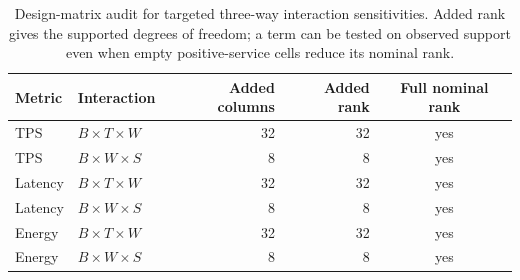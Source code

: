 \begin{table}[t]
\centering
\caption{Design-matrix audit for targeted three-way interaction sensitivities. Added rank gives the supported degrees of freedom; a term can be tested on observed support even when empty positive-service cells reduce its nominal rank.}
\label{tab:three_way_estimability}
\TableFont
\begin{tabular}{llrrc}
\hline
Metric & Interaction & Added columns & Added rank & Full nominal rank \\
\hline
TPS & $B\times T\times W$ & 32 & 32 & yes \\
TPS & $B\times W\times S$ & 8 & 8 & yes \\
Latency & $B\times T\times W$ & 32 & 32 & yes \\
Latency & $B\times W\times S$ & 8 & 8 & yes \\
Energy & $B\times T\times W$ & 32 & 32 & yes \\
Energy & $B\times W\times S$ & 8 & 8 & yes \\
\hline
\end{tabular}
\end{table}
